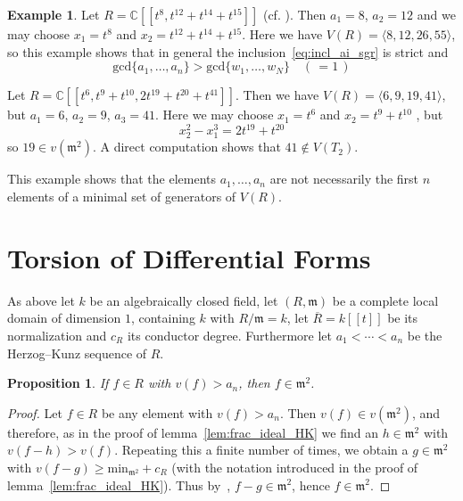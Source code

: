 \documentclass[12pt]{amsart}
\def \C{\mathbb C}
\theoremstyle{plain}%
\newtheorem{proposition}[satz]{Proposition}
\theoremstyle{definition}
\newtheorem{beispiel}{Example}[section]
\renewcommand{\(}{\left(}
\renewcommand{\)}{\right)}
\renewcommand{\geq}{\geqslant}
\begin{document}
\begin{beispiel}\label{ex:rep1}
Let $R = \C[[t^8,t^{12}+t^{14}+t^{15}]]$ (cf. 
\cite[p.3]{Fr}). Then $a_1 = 8$, $a_2 = 12$ and we may 
choose $x_1 = t^8$ and $x_2 = t^{12}+t^{14} + t^{15}$. 
Here we have $V(R) = \langle 8,12,26,55\rangle$, so this 
example shows that in general the 
inclusion~\eqref{eq:incl_ai_sgr} is strict and 
	$$ \mathrm{gcd}\{a_1, \ldots, a_n\}  > 
    \mathrm{gcd}\{w_1, \ldots, w_N\} \quad (\, = 1 \,) $$

Let $R = \C[[t^{6}, t^{9}+t^{10}, 2 t^{19}+t^{20}+t^{41}]]$. 
Then we have $V(R) = \langle 6, 9, 19, 41 \rangle$, but 
$a_1 = 6$, $a_2 = 9$, $a_3 = 41$. Here we may choose 
$x_1 = t^6$ and $x_2 = t^{9}+t^{10}$ , but 
	$$ x_2^2- x_1^3 = 2 t^{19}+ t^{20} $$
so $19 \in v(\mathfrak m^2)$. A direct computation shows 
that $41 \notin V(T_2)$.  

This example shows that the elements $a_1, \ldots, a_n$ 
are not necessarily the first $n$ elements of a minimal 
set of generators of $V(R)$. 
\end{beispiel}

\section{Torsion of Differential Forms}

As above let $k$ be an algebraically closed field, let 
$(R, \mathfrak m)$ be a complete local domain of dimension 
$1$, containing $k$ with $R/\mathfrak {m} = k$, let 
$\overline{R} = k[[t]]$ be its normalization and $c_R$ its 
conductor degree. Furthermore let $a_1 < \cdots < a_n$ be 
the Herzog--Kunz sequence of $R$. 

\begin{proposition}\label{prop:msquare}
If $f \in R$ with  $v(f)  > a_n$, then $f \in \mathfrak m^2$.
\end{proposition}

\begin{proof}
Let $f \in R$ be any element with $v(f) > a_n$. Then 
$v(f) \in v(\mathfrak m^2)$, and therefore, as in the proof 
of lemma~\ref{lem:frac_ideal_HK} we find an 
$h \in \mathfrak m^2$ with $v(f-h) > v(f)$. Repeating this 
a finite number of times, we obtain a $g \in \mathfrak m^2$ 
with $v(f-g ) \geq \mathrm{min}_{\mathfrak m^2} + c_R$ (with 
the notation introduced in the proof of 
lemma~\ref{lem:frac_ideal_HK}). Thus by~\cite[2.5]{HK}, 
$f-g \in \mathfrak m^2$, hence $f \in \mathfrak m^2$. 
\end{proof}
\end{document}

